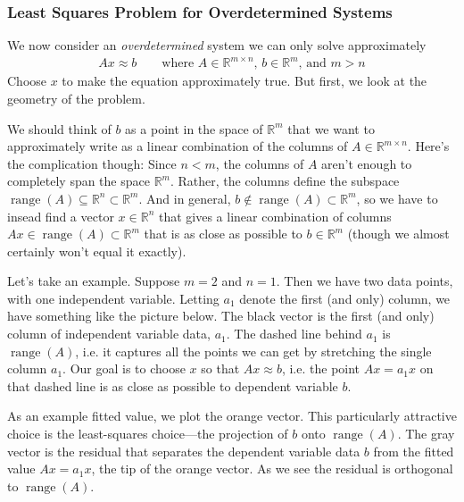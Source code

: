 \documentclass[12pt]{article}
\numberwithin{equation}{section} %
\theoremstyle{plain}
\theoremstyle{definition}
\theoremstyle{remark}
\newcommand{\Rn}{\mathbb{R}^n}
\newcommand{\Rm}{\mathbb{R}^m}
\newcommand{\Rmn}{\mathbb{R}^{m\times n}}
\newcommand{\range}{\operatorname{range}}
\begin{document}
\clearpage
\subsubsection{Least Squares Problem for Overdetermined Systems}

We now consider an \emph{overdetermined} system we can only solve
approximately
\begin{align*}
  Ax\approx b
  \qquad \text{where $A\in\Rmn$, $b\in\Rm$, and $m>n$}
\end{align*}
Choose $x$ to make the equation approximately true. But first, we
look at the geometry of the problem.

We should think of $b$ as a point in the space of $\Rm$ that we want to
approximately write as a linear combination of the columns of
$A\in\Rmn$. Here's the complication though: Since $n<m$, the columns of
$A$ aren't enough to completely span the space $\Rm$. Rather, the
columns define the subspace
$\range(A)\subseteq \Rn \subset \Rm$.
And in general, $b\not\in\range(A)\subset \Rm$, so we have to
insead find a vector $x\in\Rn$ that gives a linear combination of
columns $Ax\in\range(A)\subset\Rm$ that is as close as possible to
$b\in\Rm$ (though we almost certainly won't equal it exactly).

Let's take an example. Suppose $m=2$ and $n=1$. Then we have two
data points, with one independent variable. Letting $a_1$ denote the
first (and only) column, we have something like the picture below.
The black vector is the first (and only) column of independent variable
data, $a_1$. The dashed line behind $a_1$ is
$\range(A)$, i.e. it captures all the points we can get by stretching
the single column $a_1$. Our goal is to choose $x$ so that $Ax\approx
b$, i.e. the point $Ax=a_1x$ on that dashed line is as close as possible
to dependent variable $b$.

As an example fitted value, we plot the orange vector.
This particularly attractive choice is the least-squares choice---the
projection of $b$ onto $\range(A)$. The gray vector is the residual that
separates the dependent variable data $b$ from the fitted value
$Ax=a_1x$, the tip of the orange vector. As we see the
residual is orthogonal to $\range(A)$.
\end{document}
